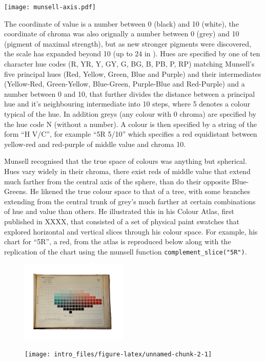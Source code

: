 \texttt{[image: munsell-axis.pdf]}

The coordinate of value is a number between 0 (black) and 10 (white),
the coordinate of chroma was also orignally a number between 0 (grey)
and 10 (pigment of maximal strength), but as new stronger pigments were
discovered, the scale has expanded beyond 10 (up to 24 in
). Hues are specified by one of ten character hue codes (R,
YR, Y, GY, G, BG, B, PB, P, RP) matching Munsell's five principal hues
(Red, Yellow, Green, Blue and Purple) and their intermediates
(Yellow-Red, Green-Yellow, Blue-Green, Purple-Blue and Red-Purple) and a
number between 0 and 10, that further divides the distance between a
principal hue and it's neighbouring intermediate into 10 steps, where 5
denotes a colour typical of the hue. In addition greys (any colour with
0 chroma) are specified by the hue code N (without a number). A colour
is then specified by a string of the form ``H V/C'', for example ``5R
5/10'' which specifies a red equidistant between yellow-red and
red-purple of middle value and chroma 10.

Munsell recognised that the true space of colours was anything but
spherical. Hues vary widely in their chroma, there exist reds of middle
value that extend much farther from the central axis of the sphere, than
do their opposite Blue-Greens. He likened the true colour space to that
of a tree, with some branches extending from the central trunk of grey's
much farther at certain combinations of hue and value than others. He
illustrated this in his Colour Atlas, first published in XXXX, that
consisted of a set of physical paint swatches that explored horizontal
and vertical slices through his colour space. For example, his chart for
``5R'', a red, from the atlas is reproduced below along with the
replication of the chart using the munsell function
\texttt{complement\_slice("5R")}.

\begin{figure}
\includegraphics[width=0.45\textwidth]{munsell-atlas-chart-r}
\begin{Schunk}

\texttt{[image: intro\_files/figure-latex/unnamed-chunk-2-1]} \end{Schunk}
\end{figure}

